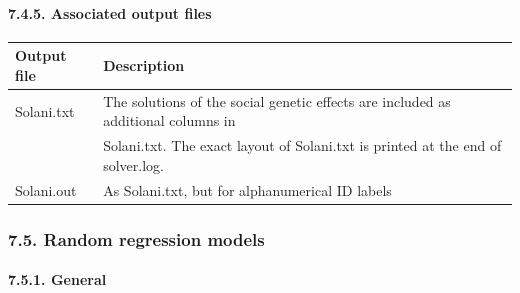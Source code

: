 \paragraph{7.4.5. Associated output files}\label{Stat19}

{\def\LTcaptype{none} %
\begin{longtable}[]{@{}
  >{\raggedright\arraybackslash}p{}
  >{\raggedright\arraybackslash}p{}@{}}
\toprule\noalign{}
\begin{minipage}[b]{\linewidth}\raggedright
Output file
\end{minipage} & \begin{minipage}[b]{\linewidth}\raggedright
Description
\end{minipage} \\
\midrule\noalign{}
\endhead
\bottomrule\noalign{}
\endlastfoot
Solani.txt & The solutions of the social genetic effects are included as
additional columns in \\
& Solani.txt. The exact layout of Solani.txt is printed at the end of
solver.log. \\
Solani.out & As Solani.txt, but for alphanumerical ID labels \\
\end{longtable}
}

\subsubsection{7.5. Random regression models}\label{Stat20}

\paragraph{7.5.1. General}\label{Stat21}

